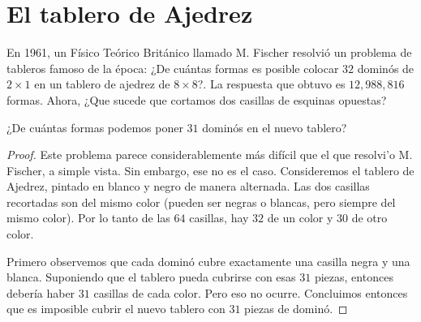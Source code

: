 \section{El tablero de Ajedrez}

En 1961, un F\'isico Te\'orico Brit\'anico llamado M. Fischer resolvi\'o un problema de tableros famoso de la \'epoca: ¿De cu\'antas formas es posible colocar $32$ domin\'os de $2\times 1$ en un tablero de ajedrez de $8\times 8$?. La respuesta que obtuvo es $12,988,816$ formas. 
Ahora, ¿Que sucede que cortamos dos casillas de esquinas opuestas?

\begin{ejem} \label{primerejemplo}
	 ¿De cu\'antas formas podemos poner $31$ domin\'os en el nuevo tablero?
\end{ejem}
\begin{proof}
	Este problema parece considerablemente m\'as dif\'icil que el que resolvi'o M. Fischer, a simple vista. Sin embargo, ese no es el caso. Consideremos el tablero de Ajedrez, pintado en blanco y negro de manera alternada. Las dos casillas recortadas son del mismo color (pueden ser negras o blancas, pero siempre del mismo color). Por lo tanto de las $64$ casillas, hay $32$ de un color y $30$ de otro color. 
	
	Primero observemos que cada domin\'o cubre exactamente una casilla negra y una blanca. Suponiendo que el tablero pueda cubrirse con esas $31$ piezas, entonces deber\'ia haber $31$ casillas de cada color. Pero eso no ocurre. Concluimos entonces que es imposible cubrir el nuevo tablero con $31$ piezas de domin\'o. 
\end{proof}
 

